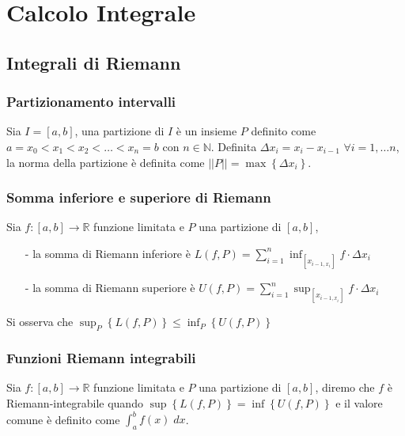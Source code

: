\documentclass[a4paper]{article}
\begin{document}
\section{Calcolo Integrale}
\subsection{Integrali di Riemann}
\subsubsection*{Partizionamento intervalli}
Sia \(I = \left[a, b\right]\), una partizione di \(I\) è un insieme \(P\) definito come \(a = x_0 < x_1 < x_2 < \dots < x_n = b \)
con \(n \in \mathbb{N}\). Definita \(\Delta x_i = x_i - x_{i-1}\) \(\forall i = 1, \dots n\), la norma della partizione è definita
come \(\left|\left|P\right|\right| = \max \left\{\Delta x_i\right\}\).

\subsubsection*{Somma inferiore e superiore di Riemann}
Sia \(f:\left[a, b\right] \to \mathbb{R}\) funzione limitata e \(P\) una partizione di \(\left[a, b\right]\),
\begin{itemize}
	\item[-] la somma di Riemann inferiore è \(\displaystyle L(f, P) = \sum_{i=1}^{n} \inf_{\left[x_{i-1,x_i}\right]} f \cdot \Delta x_i\)
	\item[-] la somma di Riemann superiore è \(\displaystyle U(f, P) = \sum_{i=1}^{n} \sup_{\left[x_{i-1,x_i}\right]} f \cdot \Delta x_i\)
\end{itemize}
Si osserva che \(\displaystyle \sup_{P} \left\{L(f,P)\right\} \leq \inf_{P} \left\{U(f,P)\right\}\)

\subsubsection*{Funzioni Riemann integrabili}
Sia \(f:\left[a, b\right] \to \mathbb{R}\) funzione limitata e \(P\) una partizione di \(\left[a, b\right]\),
diremo che \(f\) è Riemann-integrabile quando \(\sup \left\{L(f,P)\right\} = \inf \left\{U(f,P)\right\}\) e
il valore comune è definito come \(\displaystyle \int_{a}^{b} f(x) \; dx\).
\end{document}
